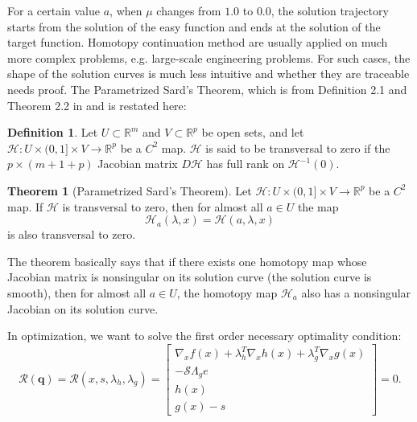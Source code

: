 \documentclass{article}
\makeatletter
\newcommand{\eg}[0]{{e.g.\@}\xspace}
\theoremstyle{definition}
\newtheorem{definition}{Definition}[section]
\newtheorem{theorem}{Theorem}
\makeatother
\begin{document}
For a certain value $a$, when $\mu$ changes from $1.0$ to $0.0$, the solution trajectory starts from the solution of the easy function and ends at the solution of the target function. Homotopy continuation method are usually applied on much more complex problems, \eg large-scale engineering problems. For such cases, the shape of the solution curves is much less intuitive and whether they are traceable needs proof. The Parametrized Sard's Theorem, which is from Definition 2.1 and Theorem 2.2 in \cite{watson_2002} and \cite{chow_1978} is restated here:

\theoremstyle{definition}
\begin{definition}
Let $U \subset \mathbb{R}^m$ and $V \subset \mathbb{R}^p $ be open sets, and let $\mathcal{H} : U \times (0,1] \times V \rightarrow \mathbb{R}^p $ be a $C^2$ map. $\mathcal{H}$ is said to be transversal to zero if the $p \times (m + 1 + p)$ Jacobian matrix $D\mathcal{H}$ has full rank on $\mathcal{H} ^{-1}(0)$.   
\end{definition}

\begin{theorem}[Parametrized Sard's Theorem]
Let $\mathcal{H} : U \times (0,1] \times V \rightarrow \mathbb{R}^p $ be a $C^2$ map. If $\mathcal{H}$ is transversal to zero, then for almost all $a \in U$ the map 
\begin{equation*}
\mathcal{H}_a(\lambda, x) = \mathcal{H}(a, \lambda, x) 
\end{equation*}
is also transversal to zero.
\end{theorem}

The theorem basically says that if there exists one homotopy map whose Jacobian matrix is nonsingular on its solution curve (the solution curve is smooth), then for almost all $a \in U$, the homotopy map $\mathcal{H}_a$ also has a nonsingular Jacobian on its solution curve. 

In optimization, we want to solve the first order necessary optimality condition: 
\begin{equation}
\mathcal{R}(\boldsymbol{q}) =\mathcal{R}(x,s,\lambda_h, \lambda_g) = \begin{bmatrix}
\nabla_x f(x)  + \lambda_h^T \nabla_x h(x)  + \lambda_g^T \nabla_x g(x)   \\
-\mathcal{S}\Lambda_g e\\
h(x) \\
g(x) - s 
\end{bmatrix} = 0.
\end{equation}
\end{document}
